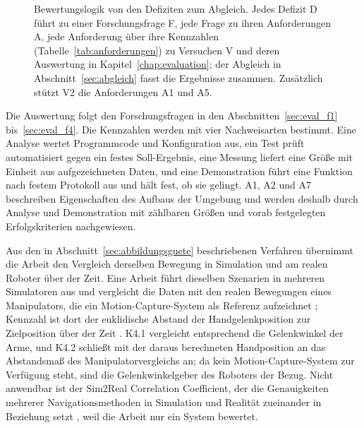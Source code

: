 \begin{figure}[!htbp]
  \centering
  
  \caption[Bewertungslogik von den Defiziten zum Abgleich]{Bewertungslogik von den Defiziten zum Abgleich. Jedes Defizit D führt zu einer Forschungsfrage F, jede Frage zu ihren Anforderungen A, jede Anforderung über ihre Kennzahlen (Tabelle~\ref{tab:anforderungen}) zu Versuchen V und deren Auswertung in Kapitel~\ref{chap:evaluation}; der Abgleich in Abschnitt~\ref{sec:abgleich} fasst die Ergebnisse zusammen. Zusätzlich stützt V2 die Anforderungen A1 und A5.}
  \label{fig:bewertungslogik}
\end{figure}

Die Auswertung folgt den Forschungsfragen in den Abschnitten~\ref{sec:eval_f1} bis~\ref{sec:eval_f4}.
Die Kennzahlen werden mit vier Nachweisarten bestimmt.
Eine Analyse wertet Programmcode und Konfiguration aus, ein Test prüft automatisiert gegen ein festes Soll-Ergebnis, eine Messung liefert eine Größe mit Einheit aus aufgezeichneten Daten, und eine Demonstration führt eine Funktion nach festem Protokoll aus und hält fest, ob sie gelingt.
A1, A2 und A7 beschreiben Eigenschaften des Aufbaus der Umgebung und werden deshalb durch Analyse und Demonstration mit zählbaren Größen und vorab festgelegten Erfolgskriterien nachgewiesen.

Aus den in Abschnitt~\ref{sec:abbildungsguete} beschriebenen Verfahren übernimmt die Arbeit den Vergleich derselben Bewegung in Simulation und am realen Roboter über der Zeit.
Eine Arbeit führt dieselben Szenarien in mehreren Simulatoren aus und vergleicht die Daten mit den realen Bewegungen eines Manipulators, die ein Motion-Capture-System als Referenz aufzeichnet \cite{Collins2019}; Kennzahl ist dort der euklidische Abstand der Handgelenkposition zur Zielposition über der Zeit \cite{Collins2019}.
K4.1 vergleicht entsprechend die Gelenkwinkel der Arme, und K4.2 schließt mit der daraus berechneten Handposition an das Abstandsmaß des Manipulatorvergleichs an; da kein Motion-Capture-System zur Verfügung steht, sind die Gelenkwinkelgeber des Roboters der Bezug.
Nicht anwendbar ist der Sim2Real Correlation Coefficient, der die Genauigkeiten mehrerer Navigationsmethoden in Simulation und Realität zueinander in Beziehung setzt \cite{Kadian2020}, weil die Arbeit nur ein System bewertet.

